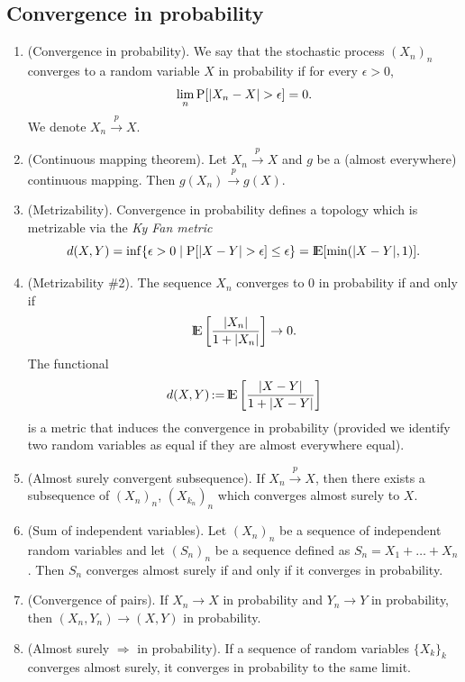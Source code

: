 \documentclass[a4paper,10pt]{scrbook}
\begin{document}
\subsection{Convergence in probability}       
\begin{enumerate}
 \item 
      (\hypertarget{link:convergence_in_probability}{Convergence in probability}). 
      We say that the stochastic process $(X_n)_n$ converges to a random variable $X$
       in probability if for every $\epsilon>0$,
       \[
        \lim_n \prob[|X_n-X|>\epsilon] = 0.
       \]
       We denote $X_n \overset{p}{\to} X$.
 \item (Continuous mapping theorem). Let $X_n \overset{p}{\to} X$ and $g$ be a (almost everywhere) continuous mapping. Then
       $g(X_n) \overset{p}{\to} g(X)$.
 \item (Metrizability). Convergence in probability defines a topology which is metrizable via the \textit{Ky Fan metric}
      \[
	d(X,Y) = \inf \{\epsilon>0 {}\mid{} \prob[|X-Y|>\epsilon]\leq \epsilon\} = \E[\min(|X-Y|,1)].
      \]
 \item (Metrizability \#2). 
       The sequence $X_n$ converges to $0$ in probability if and only if
       \[
        \E\left[ \frac{|X_n|}{1+|X_n|}\right] \to 0.
       \]
       The functional 
       \[
        d(X,Y) \dfn \E\left[ \frac{|X - Y|}{1+|X - Y|}\right]
       \]
       is a metric that induces the convergence in probability (provided we identify two random variables
       as equal if they are almost everywhere equal).
 \item (Almost surely convergent subsequence). 
       If $X_n \overset{p}{\to} X$, then there exists a subsequence of $(X_n)_n$, 
       $(X_{k_n})_n$ which converges almost surely to $X$.
       
 \item (Sum of independent variables). Let $(X_n)_n$ be a sequence of independent random 
       variables and let $(S_n)_n$ be a sequence defined as $S_n = X_1 + \ldots + X_n$.
       Then $S_n$ converges almost surely if and only if it converges in probability.      
 
 \item (Convergence of pairs). If $X_n\to X$ in probability and $Y_n\to Y$ in probability, then
       $(X_n, Y_n)\to (X,Y)$ in probability.
       
 \item (Almost surely $\Rightarrow$ in probability). If a sequence of random variables $\{X_k\}_k$ 
       converges almost surely, it converges in probability to the same limit.
       

\end{enumerate}
\end{document}
